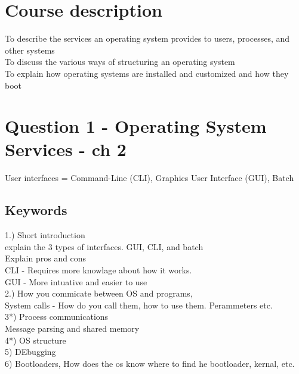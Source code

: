\documentclass[a4paper,10pt,titlepage]{report}
\date{}
\begin{document}
\renewcommand{\thepage}{\roman{page}}%
\tableofcontents
\newpage
\setcounter{page}{1}
\renewcommand{\thepage}{\arabic{page}}
\section{Course description}
To describe the services an operating system provides to
users, processes, and other systems\\
To discuss the various ways of structuring an operating
system\\
To explain how operating systems are installed and
customized and how they boot\\
\newpage
\section{Question 1 - Operating System Services - ch 2}
User interfaces = Command-Line (CLI), Graphics User Interface (GUI), Batch \\


\subsection{Keywords}
1.) Short introduction \\
\hspace{10mm}explain the 3 types of interfaces. GUI, CLI, and batch\\
\hspace{10mm}Explain pros and cons\\
\hspace{10mm}CLI - Requires more knowlage about how it works. \\
\hspace{10mm}GUI - More intuative and easier to use \\
2.)
How you commicate between OS and programs,\\
\hspace{10mm}System calls - How do you call them, how to use them. Perammeters etc. \\
3*)
Process communications\\
\hspace{10mm}Message parsing and shared memory \\ 
4*) 
OS structure \\
5)
DEbugging\\
6)
Bootloaders, How does the os know where to find he bootloader, kernal, etc. \\
\end{document}
